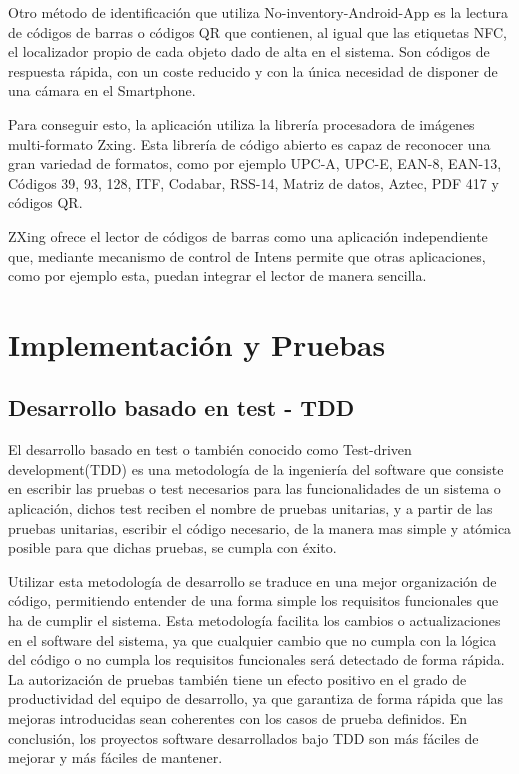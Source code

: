 \documentclass[a4paper,11pt]{book}
\begin{document}
Otro método de identificación que utiliza  No-inventory-Android-App es la lectura de códigos de barras o códigos QR que contienen, al igual que las etiquetas NFC, el localizador propio de cada objeto dado de alta en el sistema. Son códigos de respuesta rápida, con un coste reducido y con la única necesidad de disponer de una cámara en el Smartphone. 

Para conseguir esto, la aplicación utiliza la librería procesadora de imágenes multi-formato Zxing\cite{cebra}. Esta librería de código abierto  es capaz de reconocer una gran variedad de formatos, como por ejemplo  UPC-A, UPC-E, EAN-8, EAN-13, Códigos 39, 93, 128, ITF, Codabar, RSS-14, Matriz de datos, Aztec, PDF 417 y códigos QR. 

ZXing ofrece el lector de códigos de barras como una aplicación independiente que, mediante mecanismo de control de Intens\cite{cebra2} permite que otras aplicaciones, como por ejemplo esta,  puedan integrar el lector de manera sencilla.




\chapter{Implementación y Pruebas}


\section{Desarrollo basado en test - TDD}\label{sec:TDD}

El desarrollo basado en test o también conocido como Test-driven development\cite{tdd}(TDD) es una metodología de la ingeniería del software que consiste en escribir las pruebas o test necesarios para las funcionalidades de un sistema o aplicación, dichos test reciben el nombre de pruebas unitarias, y a partir de las pruebas unitarias, escribir el código necesario, de la manera mas simple y atómica posible para que dichas pruebas, se cumpla con éxito.  


Utilizar esta metodología de desarrollo se traduce en una mejor organización de código, permitiendo entender de una forma simple los requisitos funcionales que ha de cumplir el sistema. Esta metodología facilita los cambios o actualizaciones en el software del sistema, ya que cualquier cambio que no cumpla con la lógica del código o no cumpla los requisitos funcionales será detectado de forma rápida. La autorización de pruebas también tiene un efecto positivo en el grado de productividad del equipo de desarrollo, ya que garantiza de forma rápida que las mejoras introducidas sean coherentes con los casos de prueba definidos. En conclusión, los proyectos software desarrollados bajo TDD son más fáciles de mejorar y más fáciles de mantener. 
\end{document}
